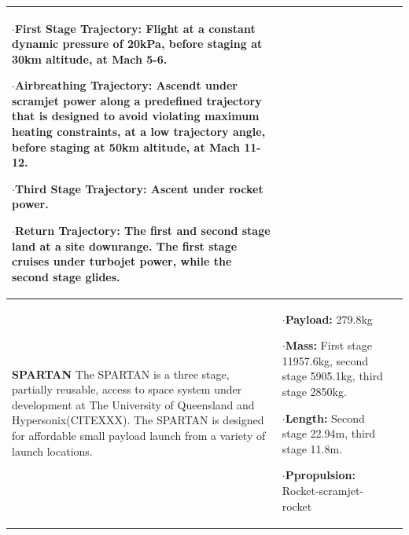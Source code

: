 {\begin{landscape}
\begin{xltabular}{\linewidth}{|X|X|X|}
	$\cdot$\textbf{First Stage Trajectory:} Flight at a constant dynamic pressure of 20kPa, before staging at 30km altitude, at Mach 5-6.
	
	$\cdot$\textbf{Airbreathing Trajectory:} Ascendt under scramjet power along a predefined trajectory that is designed to avoid violating maximum heating constraints, at a low trajectory angle, before staging at 50km altitude, at Mach 11-12.
	
	$\cdot$\textbf{Third Stage Trajectory:} Ascent under rocket power. 
	
	$\cdot$\textbf{Return Trajectory:} The first and second stage land at a site downrange. The first stage cruises under turbojet power, while the second stage glides. 
	

	\\
	\hline \small
	\textbf{SPARTAN}\cite{Preller2018a} \newline\newline
	The SPARTAN is a three stage, partially reusable, access to space system under development at The University of Queensland\cite{Jazra2013,Preller2018a} and Hypersonix(CITEXXX). The SPARTAN is designed for affordable small payload launch from a variety of launch locations. 
	&\small
	
	$\cdot$\textbf{Payload:} 279.8kg
	
	$\cdot$\textbf{Mass:} First stage 11957.6kg, second stage 5905.1kg, third stage 2850kg.
	
	$\cdot$\textbf{Length:} Second stage 22.94m, third stage 11.8m. 
	
	$\cdot$\textbf{Ppropulsion:} Rocket-scramjet-rocket
	
	
	&\small
	

\end{xltabular}
\end{landscape}}

